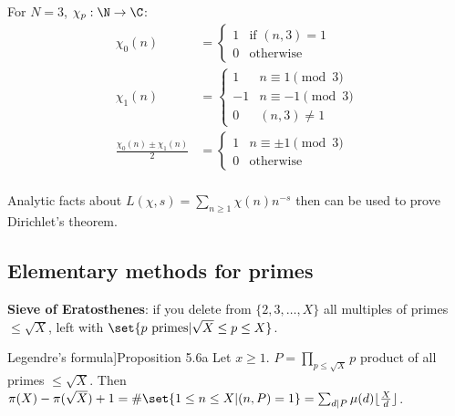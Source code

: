 \documentclass{article}
\DeclarePairedDelimiter\floor{\lfloor}{\rfloor}
\newenvironment{manual}[1]{%
    \renewcommand\themanualinner{#1}%
    \manualinner
}{\endmanualinner}
\begin{document}
\begin{eg}
    For $N=3$, $\chi_p: \N \to \C$:
    \begin{align*}
        \chi_0(n) &=
        \begin{cases}
            1 & \text{if } (n, 3) = 1 \\
            0 & \text{otherwise}
        \end{cases} \\
        \chi_1(n) &=
        \begin{cases}
            1 & n \equiv 1 \pmod{3} \\
            -1 & n \equiv -1 \pmod{3} \\
            0 & (n,3) \neq 1
        \end{cases} \\
        \frac{\chi_0(n) \pm \chi_1(n)}{2} &=
        \begin{cases}
            1 & n \equiv \pm 1 \pmod{3} \\
            0 & \text{otherwise}
        \end{cases} \\
    \end{align*}
\end{eg}

Analytic facts about $L(\chi, s) = \sum_{n \geq 1} \chi(n) n^{-s}$ then can be used to prove Dirichlet's theorem.

\subsection{Elementary methods for primes}
\textbf{Sieve of Eratosthenes}: if you delete from $\{2,3,\dotsc, X\}$ all multiples of primes $\leq \sqrt{X}$, left with $\set{p \text{ primes} | \sqrt{X} \leq p \leq X}$.

\begin{manual}[Legendre's formula]{Proposition 5.6a}\label{prop:5.6a}
    Let $x \geq 1$. $P = \prod_{p \leq \sqrt{X}} p$ product of all primes $\leq \sqrt{X}$.
    Then $\pi(X) - \pi(\sqrt{X}) + 1 = \# \set{1 \leq n \leq X | (n,P) = 1} = \sum_{d \mid P} \mu(d) \floor{\frac{X}{d}}$.
\end{manual}
\end{document}
